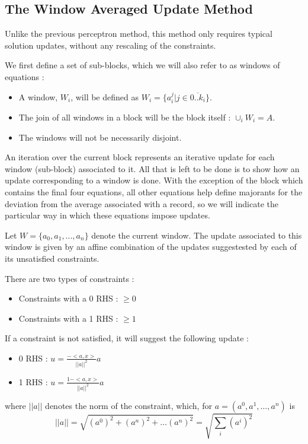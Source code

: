 \documentclass[a4paper,twoside,10pt]{report}
\begin{document}
\clearpage	

	\subsection{The Window Averaged Update Method}
	
	Unlike the previous perceptron method, this method only requires typical solution updates, without any rescaling of the constraints.
	
	We first define a set of sub-blocks, which we will also refer to as windows of equations : 
	
	\begin{itemize}
		\item A window, \(W_i\), will be defined as \(W_i = \{a_i^j | j\in \overline{0..k_i}\}\).
		\item The join of all windows in a block will be the block itself : \(\cup_{i} W_i = A\).
		\item The windows will not be necessarily disjoint.
	\end{itemize}
	
	An iteration over the current block represents an iterative update for each window (sub-block) associated to it. All that is left to be done is 
to show how an update corresponding to a window is done. With the exception of the block which contains the final four equations, all other equations
help define majorants for the deviation from the average associated with a record, so we will indicate the particular way in which these equations impose updates.

	Let \(W = \{a_0, a_1, ..., a_n\}\) denote the current window.  The update associated to this window is given by an affine combination of the updates suggestested 
by each of its unsatisfied constraints.
	
	There are two types of constraints : 
	
	\begin{itemize}
		\item Constraints with a 0 RHS : \(<a,x> \geq 0\)
		\item Constraints with a 1 RHS : \(<a,x> \geq 1\)
	\end{itemize}
	
	If a constraint is not satisfied, it will suggest the following update :
	\begin{itemize}
		\item 0 RHS : \(u = \frac{-<a,x>}{||a||^2}a\)
		\item 1 RHS : \(u = \frac{1 - <a,x>}{||a||^2}a\)
	\end{itemize}	
	where \(||a||\) denotes the norm of the constraint, which, for \(a = (a^0, a^1, \ldots, a^n)\) is 
	\[
		||a|| = \sqrt{(a^0)^2 + (a^n)^2 + \ldots (a^n)^2} = \sqrt{\sum_i  {(a^i)^2}}
	\]
	
\end{document}
